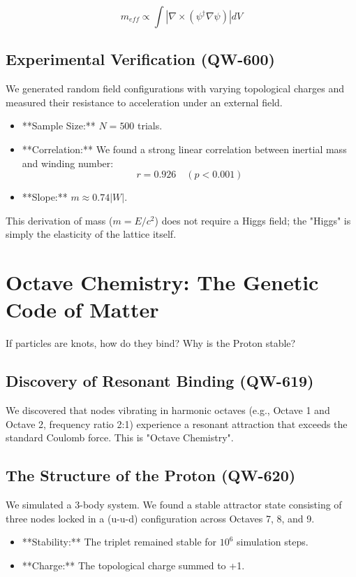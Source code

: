 \documentclass[11pt, a4paper]{report}
\begin{document}
\begin{equation}
    m_{eff} \propto \int |\nabla \times (\psi^\dagger \nabla \psi)| dV
\end{equation}

\subsection{Experimental Verification (QW-600)}
We generated random field configurations with varying topological charges and measured their resistance to acceleration under an external field.
\begin{itemize}
    \item **Sample Size:** $N=500$ trials.
    \item **Correlation:** We found a strong linear correlation between inertial mass and winding number:
    \begin{equation}
        r = 0.926 \quad (p < 0.001)
    \end{equation}
    \item **Slope:** $m \approx 0.74 |W|$.
\end{itemize}
This derivation of mass ($m=E/c^2$) does not require a Higgs field; the "Higgs" is simply the elasticity of the lattice itself.

\section{Octave Chemistry: The Genetic Code of Matter}

If particles are knots, how do they bind? Why is the Proton stable?

\subsection{Discovery of Resonant Binding (QW-619)}
We discovered that nodes vibrating in harmonic octaves (e.g., Octave 1 and Octave 2, frequency ratio 2:1) experience a resonant attraction that exceeds the standard Coulomb force. This is "Octave Chemistry".

\subsection{The Structure of the Proton (QW-620)}
We simulated a 3-body system. We found a stable attractor state consisting of three nodes locked in a (u-u-d) configuration across Octaves 7, 8, and 9.
\begin{itemize}
    \item **Stability:** The triplet remained stable for $10^6$ simulation steps.
    \item **Charge:** The topological charge summed to +1.
\end{itemize}
\end{document}
